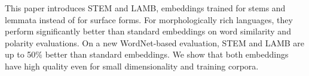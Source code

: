 This paper introduces STEM and LAMB, embeddings trained for stems and lemmata instead of for surface forms. For morphologically rich languages, they perform significantly better than standard embeddings on word similarity and polarity evaluations. On a new WordNet-based evaluation, STEM and LAMB are up to 50\% better than standard embeddings. We show that both embeddings have high quality even for small dimensionality and training corpora.
